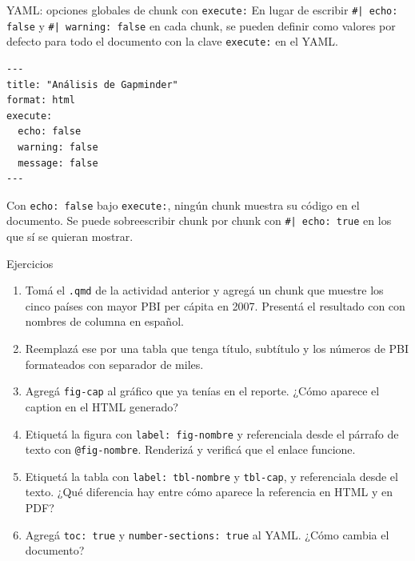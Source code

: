 \documentclass[8pt]{beamer}
\begin{document}
	\begin{frame}[fragile]{YAML: opciones globales de chunk con \texttt{execute:}}
		En lugar de escribir \texttt{\#| echo: false} y \texttt{\#| warning: false} en cada chunk, se pueden definir como valores por defecto para todo el documento con la clave \texttt{execute:} en el YAML.

\begin{lstlisting}
---
title: "Análisis de Gapminder"
format: html
execute:
  echo: false
  warning: false
  message: false
---
\end{lstlisting}

		\begin{block}{}
			Con \texttt{echo: false} bajo \texttt{execute:}, ningún chunk muestra su código en el documento. Se puede sobreescribir chunk por chunk con \texttt{\#| echo: true} en los que sí se quieran mostrar.
		\end{block}
	\end{frame}


	\begin{frame}[fragile]{Ejercicios}
		\begin{enumerate}
			\item Tomá el \texttt{.qmd} de la actividad anterior y agregá un chunk que muestre los cinco países con mayor PBI per cápita en 2007. Presentá el resultado con  con nombres de columna en español.

			\item Reemplazá ese  por una tabla  que tenga título, subtítulo y los números de PBI formateados con separador de miles.

			\item Agregá \texttt{fig-cap} al gráfico que ya tenías en el reporte. ¿Cómo aparece el caption en el HTML generado?

			\item Etiquetá la figura con \texttt{label: fig-nombre} y referenciala desde el párrafo de texto con \texttt{@fig-nombre}. Renderizá y verificá que el enlace funcione.

			\item Etiquetá la tabla con \texttt{label: tbl-nombre} y \texttt{tbl-cap}, y referenciala desde el texto. ¿Qué diferencia hay entre cómo aparece la referencia en HTML y en PDF?

			\item Agregá \texttt{toc: true} y \texttt{number-sections: true} al YAML. ¿Cómo cambia el documento?
		\end{enumerate}
	\end{frame}
\end{document}
